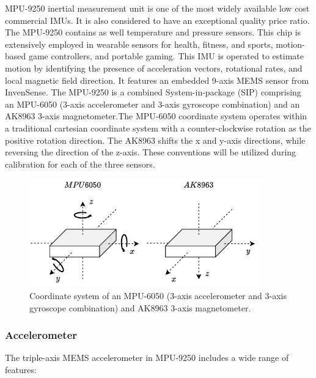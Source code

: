 MPU-9250 inertial measurement unit is one of the most widely available low cost commercial IMUs. It is also considered to have an exceptional quality price ratio. The MPU-9250 contains as well temperature and pressure sensors. This chip is extensively employed in wearable sensors for health, fitness, and sports, motion-based game controllers, and portable gaming. This IMU is operated to estimate motion by identifying the presence of acceleration vectors, rotational rates, and local magnetic field direction. It features an embedded 9-axis MEMS sensor from InvenSense. The MPU-9250 is a combined System-in-package (SIP) comprising an MPU-6050 (3-axis accelerometer and 3-axis gyroscope combination) and an AK8963 3-axis magnetometer.The MPU-6050 coordinate system operates within a traditional cartesian coordinate system with a counter-clockwise rotation as the positive rotation direction. The AK8963 shifts the x and y-axis directions, while reversing the direction of the z-axis. These conventions will be utilized during calibration for each of the three sensors.

\begin{figure}[!h]
  \centering
  \includegraphics[width=0.9\textwidth]{figures/mpu_orientation.pdf}
  \caption{ Coordinate system of an MPU-6050 (3-axis accelerometer and 3-axis gyroscope combination) and AK8963 3-axis magnetometer. }
  \label{fig:mpu_orientation}
\end{figure}

\subsubsection{Accelerometer}

The triple-axis MEMS accelerometer in MPU-9250 includes a wide range of features:

